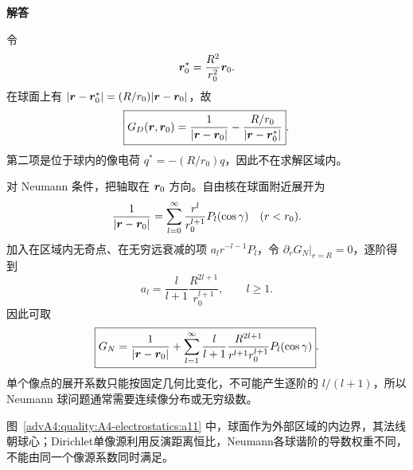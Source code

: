 \begin{advsolution}
\begin{center}\begin{minipage}{.96\linewidth}\centering
\raggedright{\bfseries\color{DeepBlue}解答}\par\smallskip\centering

\label{advA4:quality:A4-electrostatics:a11}
\end{minipage}\end{center}

令
\[
 \bm{r}_0^*=\frac{R^2}{r_0^2}\bm{r}_0.
\]
在球面上有
$|\bm{r}-\bm{r}_0^*|=(R/r_0)|\bm{r}-\bm{r}_0|$，故
\[
 \boxed{G_D(\bm{r},\bm{r}_0)=
 \frac1{|\bm{r}-\bm{r}_0|}
 -\frac{R/r_0}{|\bm{r}-\bm{r}_0^*|}}.
\]
第二项是位于球内的像电荷 $q^*=-(R/r_0)q$，因此不在求解区域内。

对 Neumann 条件，把轴取在 $\bm{r}_0$ 方向。自由核在球面附近展开为
\[
 \frac1{|\bm{r}-\bm{r}_0|}
 =\sum_{l=0}^\infty\frac{r^l}{r_0^{l+1}}P_l(\cos\gamma)
 \quad (r<r_0).
\]
加入在区域内无奇点、在无穷远衰减的项 $a_lr^{-l-1}P_l$，令
$\partial_rG_N|_{r=R}=0$，逐阶得到
\[
 a_l=\frac{l}{l+1}\frac{R^{2l+1}}{r_0^{l+1}},\qquad l\ge1.
\]
因此可取
\[
 \boxed{G_N=\frac1{|\bm{r}-\bm{r}_0|}
 +\sum_{l=1}^\infty\frac{l}{l+1}
 \frac{R^{2l+1}}{r^{l+1}r_0^{l+1}}P_l(\cos\gamma)}.
\]
单个像点的展开系数只能按固定几何比变化，不可能产生逐阶的 $l/(l+1)$，所以 Neumann 球问题通常需要连续像分布或无穷级数。

图~\ref{advA4:quality:A4-electrostatics:a11} 中，球面作为外部区域的内边界，其法线朝球心；Dirichlet单像源利用反演距离恒比，Neumann各球谐阶的导数权重不同，不能由同一个像源系数同时满足。
\end{advsolution}

